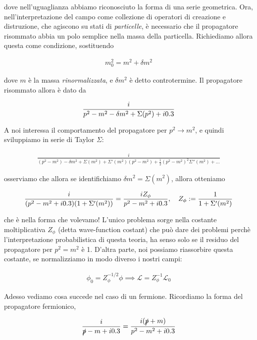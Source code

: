 \documentclass[11pt]{report}
\begin{document}
dove nell'uguaglianza abbiamo riconosciuto la forma di una serie geometrica. Ora, nell'interpretazione del campo come collezione di operatori di creazione e distruzione, che agiscono su stati di \emph{particelle}, è necessario che il propagatore risommato abbia un polo semplice nella massa della particella. Richiediamo allora questa come condizione, sostituendo 

\begin{align}
    m_0^2 = m^2 + \delta m^2
\end{align}

dove \(m\) è la massa \emph{rinormalizzata}, e \(\delta m^2\) è detto controtermine. Il propagatore risommato allora è dato da 

\begin{align}
    \frac{i}{p^2 - m^2 - \delta m^2 + \Sigma(p^2)+i0.3}
\end{align}

A noi interessa il comportamento del propagatore per \(p^2 \rightarrow m^2\), e quindi sviluppiamo in serie di Taylor \(\Sigma\): 

\begin{align}
    \frac{i}{(p^2-m^2) - \delta m^2 +\Sigma(m^2) + \Sigma'(m^2)(p^2-m^2) + \frac{1}{2}(p^2-m^2)^2 \Sigma''(m^2) + \ldots }
\end{align}

osserviamo che allora se identifichiamo \(\delta m^2 = \Sigma(m^2)\), allora otteniamo 

\begin{align}
    \frac{i}{(p^2-m^2 +i0.3)(1+\Sigma'(m^2))} = \frac{i Z_\phi}{p^2-m^2 + i0.3}, \quad Z_\phi := \frac{1}{1+\Sigma'(m^2)}
\end{align}

che è nella forma che volevamo! L'unico problema sorge nella costante moltiplicativa \(Z_\phi\) (detta wave-function costant) che può dare dei problemi perchè l'interpretazione probabilistica di questa teoria, ha senso solo se il residuo del propagatore per \(p^2 = m^2\) è 1. D'altra parte, noi possiamo riassorbire questa costante, se normalizziamo in modo diverso i nostri campi: 

\begin{align}
    \phi_0 = Z_\phi^{-1/2}\phi \implies \mathcal{L} = Z_\phi^{-1}\mathcal{L}_0
\end{align}

Adesso vediamo cosa succede nel caso di un fermione. Ricordiamo la forma del propagatore fermionico, 

\begin{align}
    \frac{i}{\slashed{p}-m+i0.3} = \frac{i(\slashed{p}+m)}{p^2-m^2 + i0.3}
\end{align}
\end{document}
